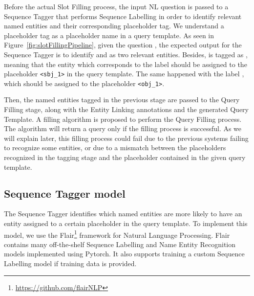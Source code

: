 Before the actual Slot Filling process, the input NL question is passed to a Sequence Tagger 
that performs Sequence Labelling in order to identify relevant named entities and their 
corresponding placeholder tag. We understand a placeholder tag as a placeholder name in a 
query template. As seen in Figure~\ref{fig:slotFillingPipeline}, given the question 
, the expected output for the Sequence Tagger is to 
identify  and  as two relevant entities. Besides, 
 is tagged as , meaning that the entity which 
corresponds to the label  should be assigned to the placeholder 
\texttt{<sbj\_1>} in the query template. The same happened with the label , 
which should be assigned to the placeholder \texttt{<obj\_1>}.

Then, the named entities tagged in the previous stage are passed to the Query Filling stage, 
along with the Entity Linking annotations and the generated Query Template. A filling 
algorithm is proposed to perform the Query Filling process. The algorithm will return a 
\SPARQL{} query only if the filling process is successful. As we will explain later, this filling 
process could fail due to the previous systems failing to recognize some entities, or due to 
a mismatch between the placeholders recognized in the tagging stage and the placeholder 
contained in the given query template.

\subsection{Sequence Tagger model}
\label{cap3:system/slotFillModule/seqTagger}
The Sequence Tagger identifies which named entities are more likely to have an entity 
assigned to a certain placeholder in the query template. To implement this model, we use the 
Flair\footnote{\url{https://github.com/flairNLP}} framework for Natural Language Processing. Flair 
contains many off-the-shelf Sequence Labelling and Name Entity Recognition models implemented 
using Pytorch. It also supports  training a custom Sequence Labelling model if training data 
is provided.

